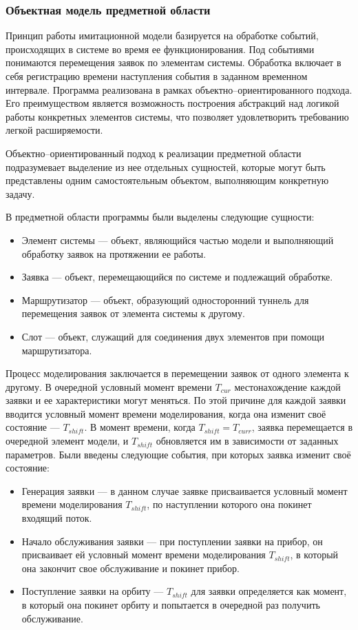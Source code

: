 \subsubsection{Объектная модель предметной области}
Принцип работы имитационной модели базируется на обработке событий, происходящих в системе во время ее функционирования. Под событиями понимаются  перемещения заявок по элементам системы. Обработка включает в себя регистрацию времени наступления события в заданном временном интервале.
Программа реализована в рамках объектно--ориентированного подхода. Его преимуществом является возможность построения абстракций над логикой работы конкретных элементов системы, что позволяет удовлетворить требованию легкой расширяемости. 

Объектно--ориентированный подход \cite{fowler1997analysis} к реализации предметной области подразумевает выделение из нее отдельных сущностей, которые могут быть представлены одним самостоятельным объектом, выполняющим конкретную задачу.

В предметной области программы были выделены следующие сущности:
\begin{itemize}
	\item Элемент системы --- объект, являющийся частью модели и выполняющий обработку заявок на протяжении ее работы.
	\item Заявка --- объект, перемещающийся по системе и подлежащий обработке.
	\item Маршрутизатор --- объект, образующий односторонний туннель для перемещения заявок от элемента системы к другому.
	\item Слот --- объект, служащий для соединения двух элементов при помощи маршрутизатора.
\end{itemize}

Процесс моделирования заключается в перемещении заявок от одного элемента к другому. В очередной условный момент времени $T_{cur}$ местонахождение каждой заявки и ее характеристики могут меняться. По этой причине для каждой заявки вводится условный момент времени моделирования, когда она изменит своё состояние --- $T_{shift}$. В момент времени, когда $T_{shift} = T_{curr}$, заявка перемещается в очередной элемент модели, и  $T_{shift}$ обновляется им в зависимости от заданных параметров. Были введены следующие события, при которых заявка изменит своё состояние:
\begin{itemize}
	\item Генерация заявки --- в данном случае заявке присваивается условный момент времени моделирования $T_{shift}$, по наступлении которого она покинет входящий поток.
	\item Начало обслуживания заявки --- при поступлении заявки на прибор, он присваивает ей условный момент времени моделирования $T_{shift}$, в который она закончит свое обслуживание и покинет прибор.
	\item Поступление заявки на орбиту --- $T_{shift}$ для заявки определяется как момент, в который она покинет орбиту и попытается в очередной раз получить обслуживание.
\end{itemize}

